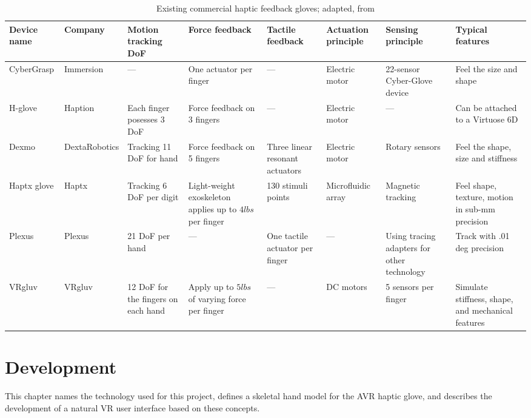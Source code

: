 \documentclass[hyperref, bachelorofscience]{cgvpub}
\begin{document}
\begin{table}
	\footnotesize
	\centering
	\begin{tabularx}{\textwidth}{llXXXXXX}		
		\toprule[2pt] \midrule
		\textbf{Device name} & \textbf{Company} & \textbf{Motion tracking DoF} & \textbf{Force feedback} & \textbf{Tactile feedback} & \textbf{Actuation principle} & \textbf{Sensing principle} & \textbf{Typical features}\\
		\midrule
		CyberGrasp & Immersion & --- & One actuator per finger & --- & Electric motor & 22-sensor Cyber-Glove device & Feel the size and shape \\
		\midrule
		H-glove & Haption & Each finger posesses 3 DoF & Force feedback on 3 fingers & --- & Electric motor & --- & Can be attached to a Virtuose 6D\\
		\midrule
		Dexmo & DextaRobotics & Tracking 11 DoF for hand & Force feedback on 5 fingers & Three linear resonant actuators & Electric motor & Rotary sensors & Feel the shape, size and stiffness \\
		\midrule
		Haptx glove & Haptx & Tracking 6 DoF per digit & Light-weight exoskeleton applies up to $ 4lbs $ per finger & 130 stimuli points & Microfluidic array & Magnetic tracking & Feel shape, texture, motion in sub-mm precision\\
		\midrule
		Plexus & Plexus & 21 DoF per hand & --- & One tactile actuator per finger & --- & Using tracing adapters for other technology & Track with .01 deg precision\\
		\midrule
		VRgluv & VRgluv & 12 DoF for the fingers on each hand & Apply up to $ 5lbs $ of varying force per finger & --- & DC motors & 5 sensors per finger & Simulate stiffness, shape, and mechanical features\\
		\midrule \bottomrule[2pt]
	\end{tabularx}
	\caption{Existing commercial haptic feedback gloves; adapted, from \cite{wang19}}
	\label{tab:commercial_gloves}
\end{table}

\chapter{Development} \label{ch:devel}
This chapter names the technology used for this project, defines a skeletal hand model for the \Gls{AVR} haptic glove, and describes the development of a natural VR user interface based on these concepts. 
\end{document}
